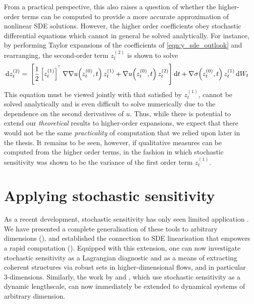 From a practical perspective, this also raises a question of whether the higher-order terms can be computed to provide a more accurate approximation of nonlinear SDE solutions.
However, the higher order coefficients obey stochastic differential equations which cannot in general be solved analytically.
For instance, by performing Taylor expansions of the coefficients of \cref{eqn:y_sde_outlook} and rearranging, the second-order term \(z_t^{(2)}\) is shown to solve
\[
	\dif z_t^{(2)} = \begin{multlined}[t]
		\left[\frac12 \left[z_t^{(1)}\right]^{\T} \nabla\nabla u\!\left(z_t^{(0)}, t\right) z_t^{(1)} + \nabla u\!\left(z_t^{(0)}, t\right) z_t^{(2)}\right]\dif t + \nabla \sigma\!\left(z_t^{(0)}, t\right) z_t^{(1)}\dif W_t
	\end{multlined}
\]
This equation must be viewed jointly with that satisfied by \(z_t^{(1)}\), cannot be solved analytically and is even difficult to solve numerically due to the dependence on the second derivatives of \(u\).
Thus, while there is potential to extend our \emph{theoretical} results to higher-order expansions, we expect that there would not be the same \emph{practicality} of computation that we relied upon later in the thesis.
It remains to be seen, however, if qualitative measures can be computed from the higher order terms, in the fashion in which stochastic sensitivity was shown to be the variance of the first order term \(z_t^{(1)}\).


\section{Applying stochastic sensitivity}\label{sec:s2_disc}
As a recent development, stochastic sensitivity has only seen limited application \citep{BadzaEtAl_2023_HowSensitiveAre,Balasuriya_2020_UncertaintyFinitetimeLyapunov,FangEtAl_2020_DisentanglingResolutionPrecision,FangOuellette_2021_AssessingInformationContent}.
We have presented a complete generalisation of these tools to arbitrary dimensions (), and established the connection to SDE linearisation that empowers a rapid computation ().
Equipped with this extension, one can now investigate stochastic sensitivity as a Lagrangian diagnostic and as a means of extracting coherent structures via robust sets in higher-dimensional flows, and in particular 3-dimensions.
Similarly, the work by \citet{FangEtAl_2020_DisentanglingResolutionPrecision} and \citet{FangOuellette_2021_AssessingInformationContent}, which use stochastic sensitivity as a dynamic lengthscale, can now immediately be extended to dynamical systems of arbitrary dimension.

